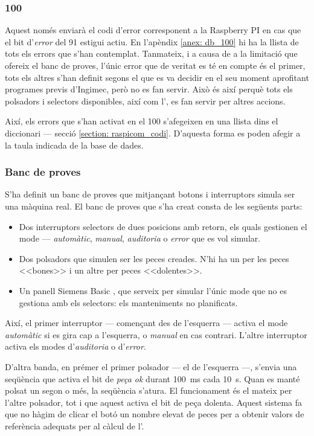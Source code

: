 \documentclass{tfgitic}[2022/06/30]
\begin{document}
\subsubsection{ 100}
Aquest  només enviarà el codi d'error corresponent a la Raspberry PI en cas que el bit d'\emph{error} del  91 estigui actiu. En l'apèndix \ref{anex: db_100} hi ha la llista de tots els errors que s'han contemplat. Tanmateix, i a causa de a la limitació que ofereix el banc de proves, l'únic error que de veritat es té en compte és el primer, tots els altres s'han definit segons el que es va decidir en el seu moment aprofitant programes previs d'Ingimec, però no es fan servir. Això és així perquè tots els polsadors i selectors disponibles, així com l', es fan servir per altres accions.

Així, els errors que s'han activat en el  100 s'afegeixen en una llista dins el diccionari --- secció \ref{section: raspicom_codi}. D'aquesta forma es poden afegir a la taula indicada de la base de dades.

\subsubsection{Banc de proves}
S'ha definit un banc de proves que mitjançant botons i interruptors simula ser una màquina real. El banc de proves que s'ha creat consta de les següents parts:

\begin{itemize}
    \item Dos interruptors selectors de dues posicions amb retorn, els quals gestionen el mode --- \emph{automàtic}, \emph{manual}, \emph{auditoria} o \emph{error} que es vol simular.
    \item Dos polsadors que simulen ser les peces creades. N'hi ha un per les peces <<bones>> i un altre per peces <<dolentes>>.
    \item Un panell  Siemens  Basic , que serveix per simular l'únic mode que no es gestiona amb els selectors: els manteniments no planificats.
\end{itemize}

Així, el primer interruptor --- començant des de l'esquerra --- activa el mode \emph{automàtic} si es gira cap a l'esquerra, o \emph{manual} en cas contrari. L'altre interruptor activa els modes d'\emph{auditoria} o d'\emph{error}.

D'altra banda, en prémer el primer polsador --- el de l'esquerra ---, s'envia una seqüència que activa el bit de \emph{peça ok} durant \SI{100}{ms} cada \SI{10}{s}. Quan es manté polsat un segon o més, la seqüència s'atura. El funcionament és el mateix per l'altre polsador, tot i que aquest activa el bit de peça dolenta. Aquest sistema fa que no hàgim de clicar el botó un nombre elevat de peces per a obtenir valors de referència adequats per al càlcul de l'.
\end{document}
